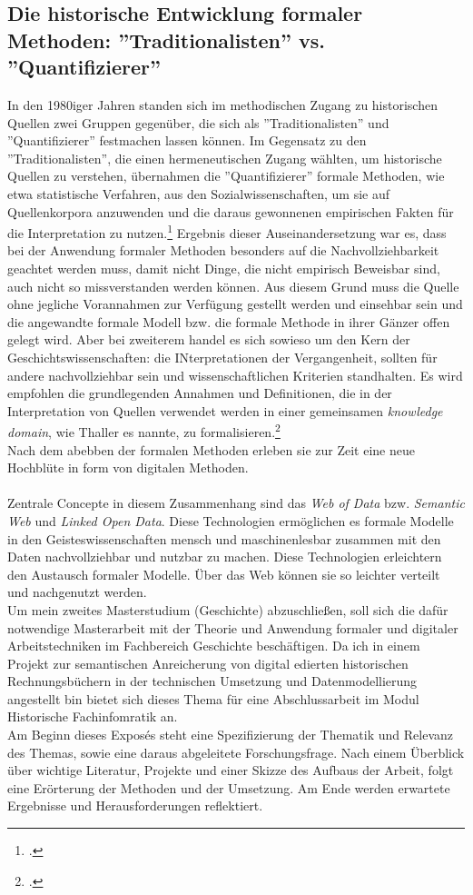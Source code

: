 \documentclass[12pt,a4paper]{article}
\begin{document}
\subsection{Die historische Entwicklung formaler Methoden: ''Traditionalisten'' vs. ''Quantifizierer'' }
In den 1980iger Jahren standen sich im methodischen Zugang zu historischen Quellen zwei Gruppen gegenüber, die sich als ''Traditionalisten'' und ''Quantifizierer'' festmachen lassen können. Im Gegensatz zu den ''Traditionalisten'', die einen hermeneutischen Zugang wählten, um historische Quellen zu verstehen, übernahmen die ''Quantifizierer'' formale Methoden, wie etwa statistische Verfahren, aus den Sozialwissenschaften, um sie auf Quellenkorpora anzuwenden und die daraus gewonnenen empirischen Fakten für die Interpretation zu nutzen.\footcite[][S.XX-XX]{jarausch1985quantitative} Ergebnis dieser Auseinandersetzung war es, dass bei der Anwendung formaler Methoden besonders auf die Nachvollziehbarkeit geachtet werden muss, damit nicht Dinge, die nicht empirisch Beweisbar sind, auch nicht so missverstanden werden können. Aus diesem Grund muss die Quelle ohne jegliche Vorannahmen zur Verfügung gestellt werden und einsehbar sein und die angewandte formale Modell bzw. die formale Methode in ihrer Gänzer offen gelegt wird. Aber bei zweiterem handel es sich sowieso um den Kern der Geschichtswissenschaften: die INterpretationen der Vergangenheit, sollten für andere nachvollziehbar sein und wissenschaftlichen Kriterien standhalten. Es wird empfohlen die grundlegenden Annahmen und Definitionen, die in der Interpretation von Quellen verwendet werden in einer gemeinsamen \textit{knowledge domain}, wie Thaller es nannte, zu formalisieren.\footcite[][S.XX-XX]{thaller2017historical}
\\ 
Nach dem abebben der formalen Methoden erleben sie zur Zeit eine neue Hochblüte in form von digitalen Methoden. 
\\
\\
Zentrale Concepte in diesem Zusammenhang sind das \textit{Web of Data} bzw. \textit{Semantic Web} und \textit{Linked Open Data}. Diese Technologien ermöglichen es formale Modelle in den Geisteswissenschaften mensch und maschinenlesbar zusammen mit den Daten nachvollziehbar und nutzbar zu machen. Diese Technologien erleichtern den Austausch formaler Modelle. Über das Web können sie so leichter verteilt und nachgenutzt werden.
\\
Um mein zweites Masterstudium (Geschichte) abzuschließen, soll sich die dafür notwendige Masterarbeit mit der Theorie und Anwendung formaler und digitaler Arbeitstechniken im Fachbereich Geschichte beschäftigen. Da ich in einem Projekt zur semantischen Anreicherung von digital edierten historischen Rechnungsbüchern in der technischen Umsetzung und Datenmodellierung angestellt bin bietet sich dieses Thema für eine Abschlussarbeit im Modul Historische Fachinfomratik an.
\\
Am Beginn dieses Exposés steht eine Spezifizierung der Thematik und Relevanz des Themas, sowie eine daraus abgeleitete Forschungsfrage. Nach einem Überblick über wichtige Literatur, Projekte und einer Skizze des Aufbaus der Arbeit, folgt eine Erörterung der Methoden und der Umsetzung. Am Ende werden erwartete Ergebnisse und Herausforderungen reflektiert.
\end{document}
